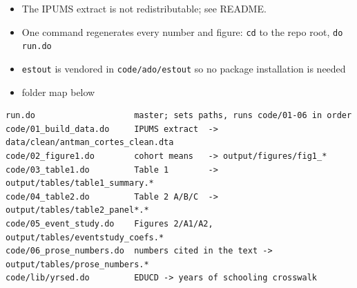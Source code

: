 \documentclass[11pt]{article}
\begin{document}
\begin{itemize}
  \item The IPUMS extract is not redistributable; see README.
  \item One command regenerates every number and figure: \texttt{cd} to the repo root, \texttt{do run.do}
  \item \texttt{estout} is vendored in \texttt{code/ado/estout} so no package installation is needed
  \item folder map below
\end{itemize}

\begin{small}\begin{verbatim}
run.do                    master; sets paths, runs code/01-06 in order
code/01_build_data.do     IPUMS extract  -> data/clean/antman_cortes_clean.dta
code/02_figure1.do        cohort means   -> output/figures/fig1_*
code/03_table1.do         Table 1        -> output/tables/table1_summary.*
code/04_table2.do         Table 2 A/B/C  -> output/tables/table2_panel*.*
code/05_event_study.do    Figures 2/A1/A2, output/tables/eventstudy_coefs.*
code/06_prose_numbers.do  numbers cited in the text -> output/tables/prose_numbers.*
code/lib/yrsed.do         EDUCD -> years of schooling crosswalk
\end{verbatim}\end{small}



\end{document}
